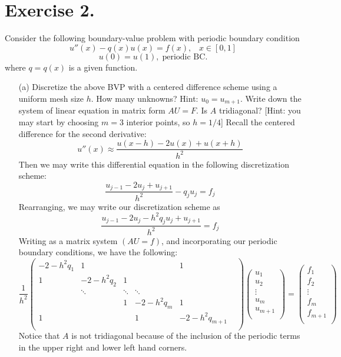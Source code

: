 \documentclass{article}
\begin{document}
\section*{Exercise 2.}
Consider the following boundary-value problem with periodic boundary condition
\[u''(x) - q(x)u(x) = f(x), \;\;\; x \in [0,1]\]
\[u(0) = u(1), \; \text{periodic BC.}\]
where $q = q(x)$ is a given function.
\begin{itemize}
    \item[(a)] Discretize the above BVP with a centered difference scheme using a uniform mesh size $h$. How many unknowns? Hint: $u_0 = u_{m+1}$. Write down the system of linear equation in matrix form $AU = F$. Is $A$ tridiagonal? [Hint: you may start by choosing $m=3$ interior points, so $h = 1/4$]
    \newline\newline
    Recall the centered difference for the second derivative:
    \[u''(x) \approx \frac{u(x-h) - 2u(x) + u(x+h)}{h^2}\]
    Then we may write this differential equation in the following discretization scheme:
    \[\frac{u_{j-1} - 2u_j + u_{j+1}}{h^2} - q_ju_j = f_j\]
    Rearranging, we may write our discretization scheme as
    \[\frac{u_{j-1} - 2u_j - h^2q_ju_j + u_{j+1}}{h^2} = f_j\]
    Writing as a matrix system $(AU = f)$, and incorporating our periodic boundary conditions, we have the following:
    \[ \frac{1}{h^2}\begin{pmatrix}
        -2-h^2q_1 & 1 & &  & 1 \\
        1 & -2-h^2q_2 & 1 &  &  \\
        & \ddots & \ddots & \ddots &  &  \\
        & & 1 & -2-h^2q_m & 1 \\
        1 & &  & 1 & -2-h^2q_{m+1} \\
    \end{pmatrix}
    \begin{pmatrix}
        u_1 \\
        u_2 \\
        \vdots \\
        u_m \\
        u_{m+1} \\
    \end{pmatrix}
    = 
    \begin{pmatrix}
        f_1 \\
        f_2 \\
        \vdots \\
        f_m \\
        f_{m+1} \\
    \end{pmatrix}
    \]
    Notice that $A$ is not tridiagonal because of the inclusion of the periodic terms in the upper right and lower left hand corners.


\end{itemize}
\end{document}
